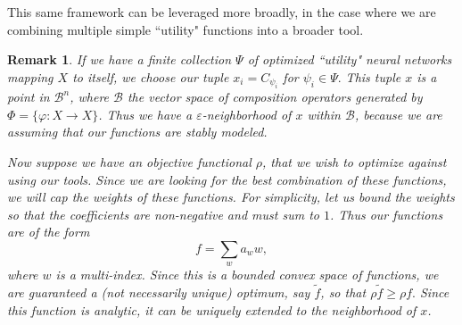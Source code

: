 \documentclass[12pt]{amsart}
\newtheorem{remark}{Remark}[theorem]
\theoremstyle{definition}
\numberwithin{equation}{section}
\begin{document}
This same framework can be leveraged more broadly, in the case where we are combining multiple simple ``utility" functions into a broader tool.

\begin{remark}
    If we have a finite collection $\Psi$ of optimized ``utility" neural networks mapping $X$ to itself, we choose our tuple $x_i = C_{\psi_i}$ for $ \psi_i \in \Psi.$ This tuple $x$ is a point in $\mathcal B^n$, where $\mathcal B$ the vector space of composition operators generated by $\Phi = \{\varphi : X\rightarrow X\}$. Thus we have a $\varepsilon$-neighborhood of $x$ within $\mathcal B$, because we are assuming that our functions are stably modeled. 

    Now suppose we have an objective functional $\rho$, that we wish to optimize against using our tools. Since we are looking for the best combination of these functions, we will cap the weights of these functions. For simplicity, let us bound the weights so that the coefficients are non-negative and must sum to $1$. Thus our functions are of the form \[f = \sum_wa_ww,\] where $w$ is a multi-index. Since this is a bounded convex space of functions, we are guaranteed a (not necessarily unique) optimum, say $\tilde f$, so that $\rho\tilde f \geq \rho f.$ Since this function is analytic, it can be uniquely extended to the neighborhood of $x$. 
\end{remark}







\end{document}
